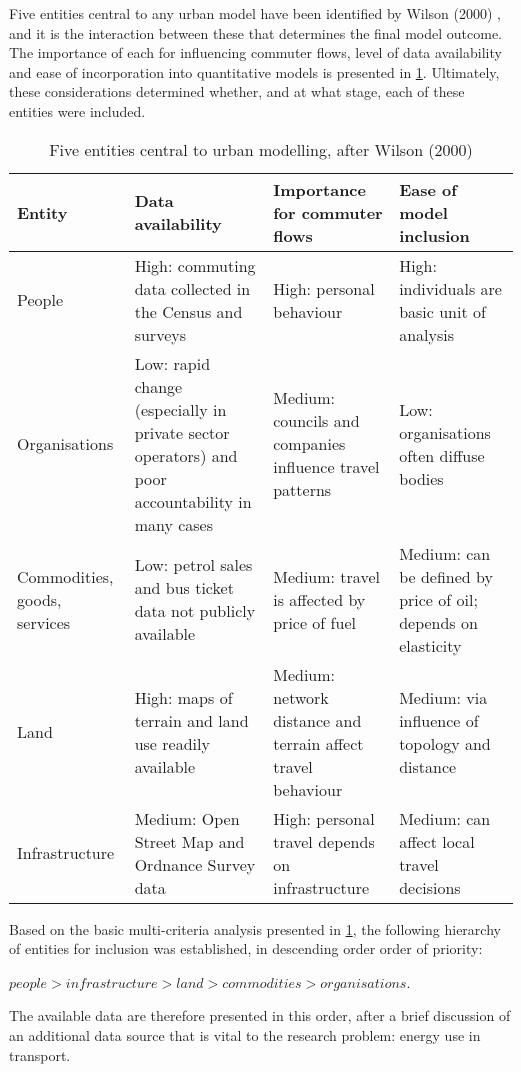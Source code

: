 Five entities central to any urban model have been identified
by Wilson (2000) \citep{ballas2003microsimulation-30-years}, and
it is the interaction between these that determines
the final model outcome. The importance of each
for influencing commuter flows, level of data availability and
ease of incorporation into quantitative models is presented in
\cref{t:entities}. Ultimately, these considerations determined
whether, and at what stage, each of these entities were included.
\begin{table}[htbp]
\caption{Five entities central to urban modelling, after Wilson (2000)}
\begin{tabular}{p{2cm}p{3.5cm}p{3.5cm}p{3.5cm}} \toprule
Entity & Data availability & Importance for commuter flows & Ease of model inclusion \\ \midrule
People & High: commuting data collected in the Census and surveys & High: personal behaviour & High: individuals are basic unit of analysis \\
Organisations & Low: rapid change (especially in private sector operators) and poor accountability in many cases & Medium: councils and companies influence travel patterns & Low: organisations often
diffuse bodies \\
Commodities, goods, services & Low: petrol sales and bus ticket data not publicly available & Medium: travel is affected by price of fuel & Medium: can be defined by price of oil; depends on
elasticity \\
Land & High: maps of terrain and land use readily available & Medium: network distance and terrain affect travel behaviour & Medium: via influence of topology and distance \\
Infrastructure & Medium: Open Street Map and Ordnance Survey data & High: personal travel depends on infrastructure & Medium: can affect local travel decisions \\
\bottomrule
\end{tabular}
\label{t:entities}
\end{table}
Based on the basic multi-criteria analysis presented in
\cref{t:entities}, the following
hierarchy of entities for inclusion was established, in descending order
order of priority:

$people > infrastructure > land > commodities > organisations$.

The available data are therefore presented in this order, after a
brief discussion of an additional data source that is
vital to the research problem: energy use in transport.

